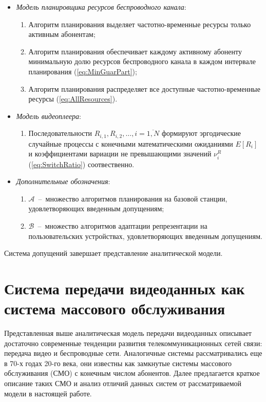 \begin{itemize}
\begin{enumerate}
		\end{enumerate}
	\item \textit{Модель планировщика ресурсов беспроводного канала}:
		\begin{enumerate}
			\item Алгоритм планирования выделяет частотно-временные ресурсы только активным абонентам;
			\item Алгоритм планирования обеспечивает каждому активному абоненту минимальную долю ресурсов беспроводного канала в каждом интервале планирования (\ref{eq:MinGuarPart});
			\item Алгоритм планирования распределяет все доступные частотно-временные ресурсы (\ref{eq:AllResources}).
		\end{enumerate}
	\item \textit{Модель видеоплеера}:
		\begin{enumerate}
			\item Последовательности $R_{i,1}, R_{i,2}, \ldots, i=\overline{1,N}$ формируют эргодические случайные процессы с конечными математическими ожиданиями $E[R_{i}]$ и коэффициентами вариации не превышающими значений $\nu^R_i$ (\ref{eq:SwitchRatio}) соотвественно.
		\end{enumerate}
  \item \textit{Дополнительные обозначения}:
  \begin{enumerate}
  \item $\mathcal{A}$~--~множество алгоритмов планирования на базовой станции, удовлетворяющих введенным допущениям;
  \item $\mathcal{B}$~--~множество алгоритмов адаптации репрезентации на пользовательских устройствах, удовлетворяющих введенным допущениям.
  \end{enumerate}
\end{itemize}
Система допущений завершает представление аналитической модели.

\section{Система передачи видеоданных как система массового обслуживания}
\label{chap2:QueuningNetwork}

Представленная выше аналитическая модель передачи видеоданных описывает достаточно современные тенденции развития телекоммуникационных сетей связи: передача видео и беспроводные сети. Аналогичные системы рассматривались еще в 70-х годах 20-го века, они известны как замкнутые системы массового обслуживания (СМО) с конечным числом абонентов. Далее предлагается краткое описание таких СМО и анализ отличий данных систем от рассматриваемой модели в настоящей работе.

